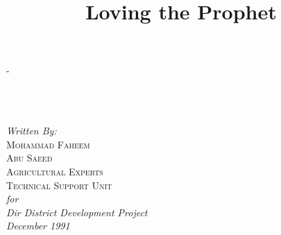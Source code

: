 \documentclass[twoside,openright]{book}
\title{Loving the Prophet}
\author{}
\date{}
\begin{document}
\begin{titlingpage}
\let\cleardoublepage\clearpage
\calccentering{\unitlength}{-0.7cm}
\begin{adjustwidth*}{\unitlength}{-\unitlength}     %
    \begin{adjustwidth}{-1cm}{-1cm}                 %
      \begin{center}
      {\textbf{}} \\
      \vspace{0.25cm}
      {\textbf{}} \\

      \vspace{2.8cm}
      \vfill

      {\large{\textit{Written By:}}} \\
      \vspace{5mm}
      {\large{\textsc{Mohammad Faheem}}} \\
      \vspace{2mm}
      {\large{\textsc{Abu Saeed}}} \\
      \vspace{2mm}
      {\large{\textsc{Agricultural Experts}}} \\
      \vspace{2mm}
      {\large{\textsc{Technical Support Unit}}} \\

      \vspace{8mm}
      \textit{\large{for}} \\
      \vspace{2mm}
      \textit{\large{Dir District Development Project}} \\
      \vspace{2mm}
      \textit{\large{December 1991}}

      \end{center}
    \end{adjustwidth}
\end{adjustwidth*}
\end{titlingpage}
\end{document}
